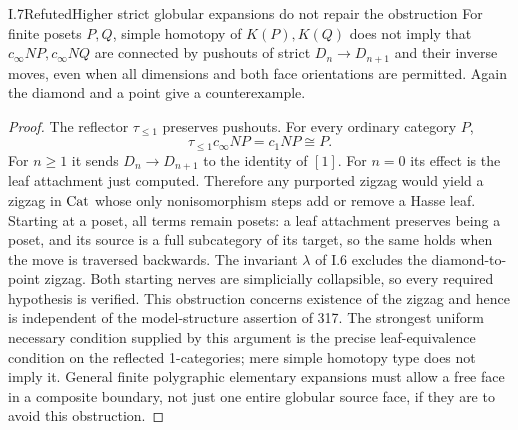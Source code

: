 \begin{claim}{I.7}{Refuted}{Higher strict globular expansions do not repair the obstruction}
For finite posets $P,Q$, simple homotopy of $K(P),K(Q)$ does not imply
that $c_\infty NP,c_\infty NQ$ are connected by pushouts of strict
$D_n\to D_{n+1}$ and their inverse moves, even when all dimensions
and both face orientations are permitted. Again the diamond and a
point give a counterexample.
\end{claim}
\begin{proof}
The reflector $\tau_{\leq1}$ preserves pushouts. For every ordinary
category $P$,
\[
 \tau_{\leq1}c_\infty NP=c_1NP\cong P.
\]
For $n\geq1$ it sends $D_n\to D_{n+1}$ to the identity of $[1]$.
For $n=0$ its effect is the leaf attachment just computed. Therefore
any purported zigzag would yield a zigzag in $\mathrm{Cat}$ whose only
nonisomorphism steps add or remove a Hasse leaf. Starting at a poset,
all terms remain posets: a leaf attachment preserves being a poset,
and its source is a full subcategory of its target, so the same holds
when the move is traversed backwards. The invariant $\lambda$ of
I.6 excludes the diamond-to-point zigzag. Both starting nerves are
simplicially collapsible, so every required hypothesis is verified.
This obstruction concerns existence of the zigzag and hence is
independent of the model-structure assertion of 317. The strongest
uniform necessary condition supplied by this argument is the precise
leaf-equivalence condition on the reflected 1-categories; mere simple
homotopy type does not imply it. General finite polygraphic elementary
expansions must allow a free face in a composite boundary, not just
one entire globular source face, if they are to avoid this obstruction.
\end{proof}

